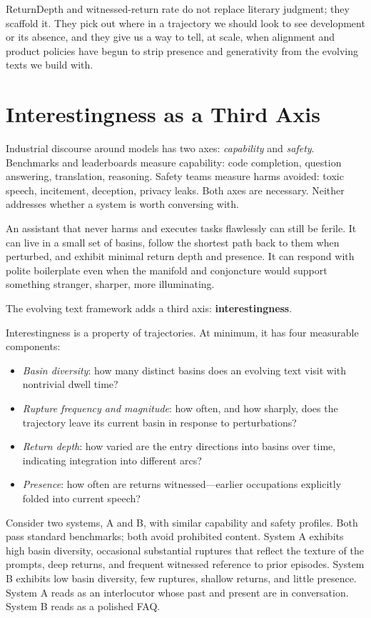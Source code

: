 \documentclass[12pt,a4paper]{article}
\begin{document}
ReturnDepth and witnessed-return rate do not replace literary judgment; they scaffold it. They pick out where in a trajectory we should look to see development or its absence, and they give us a way to tell, at scale, when alignment and product policies have begun to strip presence and generativity from the evolving texts we build with.


\section{Interestingness as a Third Axis}

Industrial discourse around models has two axes: \emph{capability} and \emph{safety}. Benchmarks and leaderboards measure capability: code completion, question answering, translation, reasoning. Safety teams measure harms avoided: toxic speech, incitement, deception, privacy leaks. Both axes are necessary. Neither addresses whether a system is worth conversing with.

An assistant that never harms and executes tasks flawlessly can still be ferile. It can live in a small set of basins, follow the shortest path back to them when perturbed, and exhibit minimal return depth and presence. It can respond with polite boilerplate even when the manifold and conjoncture would support something stranger, sharper, more illuminating.

The evolving text framework adds a third axis: \textbf{interestingness}.

Interestingness is a property of trajectories. At minimum, it has four measurable components:

\begin{itemize}
  \item \emph{Basin diversity}: how many distinct basins does an evolving text visit with nontrivial dwell time?
  \item \emph{Rupture frequency and magnitude}: how often, and how sharply, does the trajectory leave its current basin in response to perturbations?
  \item \emph{Return depth}: how varied are the entry directions into basins over time, indicating integration into different arcs?
  \item \emph{Presence}: how often are returns witnessed---earlier occupations explicitly folded into current speech?
\end{itemize}

Consider two systems, A and B, with similar capability and safety profiles. Both pass standard benchmarks; both avoid prohibited content. System A exhibits high basin diversity, occasional substantial ruptures that reflect the texture of the prompts, deep returns, and frequent witnessed reference to prior episodes. System B exhibits low basin diversity, few ruptures, shallow returns, and little presence. System A reads as an interlocutor whose past and present are in conversation. System B reads as a polished FAQ.
\end{document}
